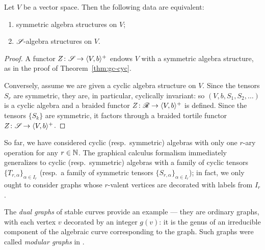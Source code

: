 \begin{theorem}\label{thm:gc-sym}
  Let $V$ be a vector space. Then the following data are equivalent:
  \begin{enumerate}
  \item symmetric algebra structures on $V$;
  \item $\mathscr{S}_{}$-algebra structures on $V$.
  \end{enumerate}
\end{theorem}
\begin{proof}
  A functor $Z\colon\mathscr{S}_{}\to\langle V,b\rangle^+$ endows $V$ with a symmetric algebra
  structure, as in the proof of Theorem~\ref{thm:gc-cyc}.
  
  Conversely, assume we are given a cyclic algebra structure on $V$.
  Since the tensors $S_r$ are symmetric, they are, in particular,
  cyclically invariant: so $(V,b,S_1,S_2,\dots)$ is a cyclic algebra
  and a braided functor $Z\colon\mathscr{R}\to\langle V,b\rangle^+$ is defined.  Since the
  tensors $\{S_k\}$ are symmetric, it factors through a braided
  tortile functor $Z\colon\mathscr{S}_{}\to\langle V,b\rangle^+$.
\end{proof}
\begin{remark}
  \label{rem:many-sorted-graphs}
  So far, we have considered cyclic (resp.\ symmetric) algebras with
  only one $r$-ary operation for any $r\in\mathbb{N}$. The graphical calculus
  formalism immediately generalizes to cyclic (resp.\ symmetric)
  algebras with a family of cyclic tensors $\{T_{r,\alpha}\}_{\alpha\in
    I_r}$
  (resp.\ a family of symmetric tensors $\{S_{r,\alpha}\}_{\alpha\in
    I_r}$);
  in fact, we only ought to consider graphs whose $r$-valent vertices
  are decorated with labels from $I_r$.

  The \emph{dual graphs} of stable curves \cite{deligne-mumford} provide
  an example --- they are ordinary graphs, with each vertex $v$
  decorated by an integer $g(v)$: it is the genus of an irreducible
  component of the algebraic curve corresponding to the graph. Such
  graphs were called \emph{modular graphs} in \cite{getzler-kapranov}.
\end{remark}

